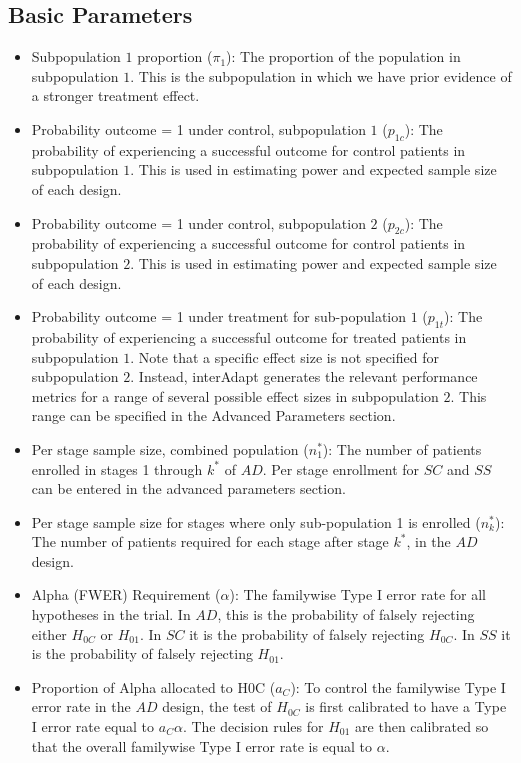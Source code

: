 \documentclass{article}
\newcommand{\interAdapt}{\textsf{interAdapt }}
\begin{document}
\subsection*{Basic Parameters}
\begin{itemize} 

\item Subpopulation $1$ proportion ($π_1$): The proportion of the population in subpopulation $1$. This is the subpopulation in which we have prior evidence of a stronger treatment effect. 

\item Probability outcome = 1 under control, subpopulation $1$ ($p_{1c}$): The probability of experiencing a successful outcome for control patients in subpopulation $1$. This is used in estimating power and expected sample size of each design.

\item Probability outcome = 1 under control, subpopulation $2$ ($p_{2c}$): The probability of experiencing a successful outcome for control patients in subpopulation $2$. This is used in estimating power and expected sample size of each design.

\item Probability outcome = 1 under treatment for sub-population $1$ ($p_{1t}$): The probability of experiencing a successful outcome for treated patients in subpopulation $1$. Note that a specific effect size is not specified for subpopulation $2$. Instead, \interAdapt generates the relevant performance metrics for a range of several possible effect sizes in subpopulation $2$. This range can be specified in the Advanced Parameters section.%

\item Per stage sample size, combined population ($n_1^*$): The number of patients enrolled in stages 1 through $k^*$ of $AD$. Per stage enrollment for $SC$ and $SS$ can be entered in the advanced parameters section.


\item Per stage sample size for stages where only sub-population 1 is enrolled ($n_k^*$): The number of patients required for each stage after stage $k^*$, in the $AD$ design.

\item Alpha (FWER) Requirement ($α$): The familywise Type I error rate for all hypotheses in the trial. In $AD$, this is the probability of falsely rejecting either $H_{0C}$ or $H_{01}$. In $SC$ it is the probability of falsely rejecting $H_{0C}$. In $SS$ it is the probability of falsely rejecting $H_{01}$.

\item Proportion of Alpha allocated to H0C ($a_C$): To control the familywise Type I error rate in the $AD$ design, the test of $H_{0C}$ is first calibrated to have a Type I error rate equal to $a_Cα$. The decision rules for $H_{01}$ are then calibrated so that the overall familywise Type I error rate is equal to $α$.


\end{itemize}
\end{document}
